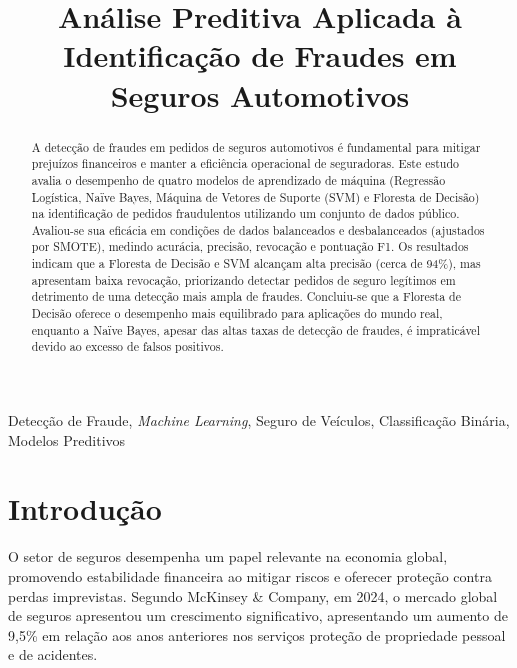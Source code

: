 \documentclass[conference]{IEEEtran}
\begin{document}
\title{Análise Preditiva Aplicada à Identificação de Fraudes em Seguros Automotivos
}

\author{
}

\maketitle

\begin{abstract}
A detecção de fraudes em pedidos de seguros automotivos é fundamental para mitigar prejuízos financeiros e manter a eficiência operacional de seguradoras. Este estudo avalia o desempenho de quatro modelos de aprendizado de máquina (Regressão Logística, Naïve Bayes, Máquina de Vetores de Suporte (SVM) e Floresta de Decisão) na identificação de pedidos fraudulentos utilizando um conjunto de dados público. Avaliou-se sua eficácia em condições de dados balanceados e desbalanceados (ajustados por SMOTE), medindo acurácia, precisão, revocação e pontuação F1. Os resultados indicam que a Floresta de Decisão e SVM alcançam alta precisão (cerca de 94\%), mas apresentam baixa revocação, priorizando detectar pedidos de seguro legítimos em detrimento de uma detecção mais ampla de fraudes. Concluiu-se que a Floresta de Decisão oferece o desempenho mais equilibrado para aplicações do mundo real, enquanto a Naïve Bayes, apesar das altas taxas de detecção de fraudes, é impraticável devido ao excesso de falsos positivos.
\end{abstract}

\begin{IEEEkeywords}
Detecção de Fraude, \textit{Machine Learning}, Seguro de Veículos, Classificação Binária, Modelos Preditivos
\end{IEEEkeywords}

\section{Introdução}

O setor de seguros desempenha um papel relevante na economia global, promovendo estabilidade financeira ao mitigar riscos e oferecer proteção contra perdas imprevistas. Segundo McKinsey \& Company\cite{b1}, em 2024, o mercado global de seguros apresentou um crescimento significativo, apresentando um aumento de 9,5\% em relação aos anos anteriores nos serviços proteção de propriedade pessoal e de acidentes.
\end{document}
